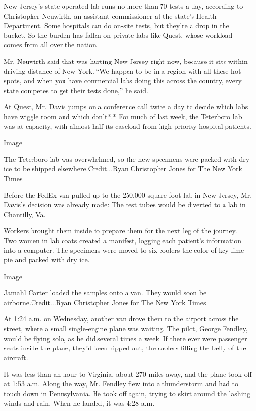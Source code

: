 New Jersey's state-operated lab runs no more than 70 tests a day,
according to Christopher Neuwirth, an assistant commissioner at the
state's Health Department. Some hospitals can do on-site tests, but
they're a drop in the bucket. So the burden has fallen on private labs
like Quest, whose workload comes from all over the nation.

Mr. Neuwirth said that was hurting New Jersey right now, because it sits
within driving distance of New York. ``We happen to be in a region with
all these hot spots, and when you have commercial labs doing this across
the country, every state competes to get their tests done,'' he said.

At Quest, Mr. Davis jumps on a conference call twice a day to decide
which labs have wiggle room and which don't*.* For much of last week,
the Teterboro lab was at capacity, with almost half its caseload from
high-priority hospital patients.

Image

The Teterboro lab was overwhelmed, so the new specimens were packed with
dry ice to be shipped elsewhere.Credit...Ryan Christopher Jones for The
New York Times

Before the FedEx van pulled up to the 250,000-square-foot lab in New
Jersey, Mr. Davis's decision was already made: The test tubes would be
diverted to a lab in Chantilly, Va.

Workers brought them inside to prepare them for the next leg of the
journey. Two women in lab coats created a manifest, logging each
patient's information into a computer. The specimens were moved to six
coolers the color of key lime pie and packed with dry ice.

Image

Jamahl Carter loaded the samples onto a van. They would soon be
airborne.Credit...Ryan Christopher Jones for The New York Times

At 1:24 a.m. on Wednesday, another van drove them to the airport across
the street, where a small single-engine plane was waiting. The pilot,
George Fendley, would be flying solo, as he did several times a week. If
there ever were passenger seats inside the plane, they'd been ripped
out, the coolers filling the belly of the aircraft.

It was less than an hour to Virginia, about 270 miles away, and the
plane took off at 1:53 a.m. Along the way, Mr. Fendley flew into a
thunderstorm and had to touch down in Pennsylvania. He took off again,
trying to skirt around the lashing winds and rain. When he landed, it
was 4:28 a.m.


